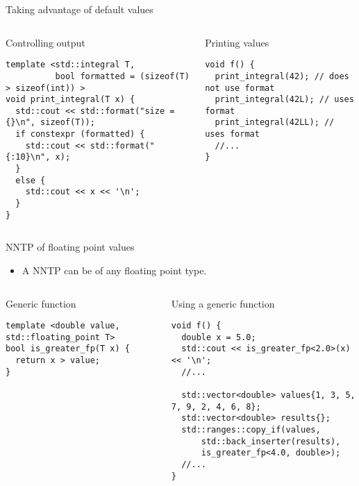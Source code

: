 \begin{frame}[t,fragile]{Taking advantage of default values}

\begin{columns}[T]

\begin{block}{Controlling output}
\begin{lstlisting}
template <std::integral T, 
          bool formatted = (sizeof(T) > sizeof(int)) >
void print_integral(T x) {
  std::cout << std::format("size = {}\n", sizeof(T));
  if constexpr (formatted) {
    std::cout << std::format("{:10}\n", x);
  }
  else {
    std::cout << x << '\n';
  }
}
\end{lstlisting}
\end{block}

\begin{block}{Printing values}
\begin{lstlisting}
void f() {
  print_integral(42); // does not use format
  print_integral(42L); // uses format
  print_integral(42LL); // uses format
  //...
}
\end{lstlisting}
\end{block}

\end{columns}

\end{frame}

\begin{frame}[t,fragile]{NNTP of floating point values}
\begin{itemize}
  \item A NNTP can be of any floating point type.
\end{itemize}

\begin{columns}[T]

\begin{block}{Generic function}
\begin{lstlisting}
template <double value, std::floating_point T>
bool is_greater_fp(T x) {
  return x > value;
}
\end{lstlisting}
\end{block}

\begin{block}{Using a generic function}
\begin{lstlisting}
void f() {
  double x = 5.0;
  std::cout << is_greater_fp<2.0>(x) << '\n';
  //...

  std::vector<double> values{1, 3, 5, 7, 9, 2, 4, 6, 8};
  std::vector<double> results{};
  std::ranges::copy_if(values, 
      std::back_inserter(results), 
      is_greater_fp<4.0, double>);
  //...
}
\end{lstlisting}
\end{block}

\end{columns}
\end{frame}



